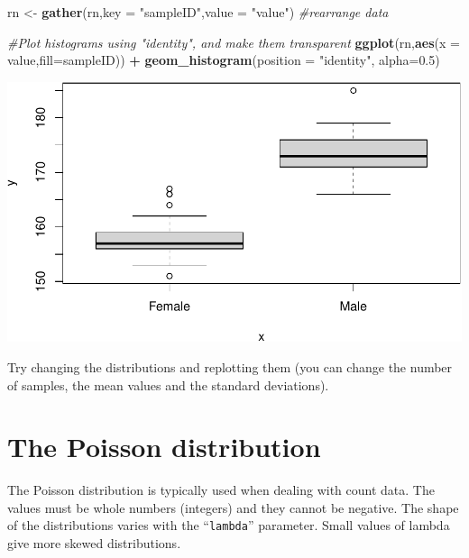 \documentclass[
  a4paperpaper,
]{book}
\newenvironment{Shaded}{\begin{snugshade}}{\end{snugshade}}
\newcommand{\CommentTok}[1]{\textcolor[rgb]{0.56,0.35,0.01}{\textit{#1}}}
\newcommand{\DataTypeTok}[1]{\textcolor[rgb]{0.13,0.29,0.53}{#1}}
\newcommand{\FloatTok}[1]{\textcolor[rgb]{0.00,0.00,0.81}{#1}}
\newcommand{\KeywordTok}[1]{\textcolor[rgb]{0.13,0.29,0.53}{\textbf{#1}}}
\newcommand{\NormalTok}[1]{#1}
\newcommand{\OperatorTok}[1]{\textcolor[rgb]{0.81,0.36,0.00}{\textbf{#1}}}
\newcommand{\StringTok}[1]{\textcolor[rgb]{0.31,0.60,0.02}{#1}}
\begin{document}
\begin{Shaded}
\begin{Highlighting}[]
\NormalTok{rn \textless{}{-}}\StringTok{ }\KeywordTok{gather}\NormalTok{(rn,}\DataTypeTok{key =} \StringTok{"sampleID"}\NormalTok{,}\DataTypeTok{value =} \StringTok{"value"}\NormalTok{) }\CommentTok{\#rearrange data}

\CommentTok{\#Plot histograms using "identity", and make them transparent}
\KeywordTok{ggplot}\NormalTok{(rn,}\KeywordTok{aes}\NormalTok{(}\DataTypeTok{x =}\NormalTok{ value,}\DataTypeTok{fill=}\NormalTok{sampleID)) }\OperatorTok{+}
\StringTok{  }\KeywordTok{geom\_histogram}\NormalTok{(}\DataTypeTok{position =} \StringTok{"identity"}\NormalTok{, }\DataTypeTok{alpha=}\FloatTok{0.5}\NormalTok{)}
\end{Highlighting}
\end{Shaded}

\begin{center}\includegraphics{BB852_files/figure-latex/unnamed-chunk-99-1} \end{center}

Try changing the distributions and replotting them (you can change the number of samples, the mean values and the standard deviations).

\hypertarget{the-poisson-distribution}{%
\section{The Poisson distribution}\label{the-poisson-distribution}}

The Poisson distribution is typically used when dealing with count data. The values must be whole numbers (integers) and they cannot be negative. The shape of the distributions varies with the ``\texttt{lambda}'' parameter. Small values of lambda give more skewed distributions.
\end{document}
